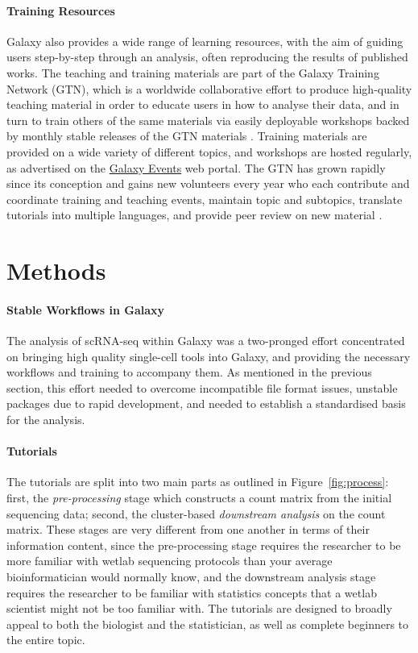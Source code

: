 \documentclass[a4paper,num-refs]{oup-contemporary}
\begin{document}
\paragraph{Training Resources}
Galaxy also provides a wide range of learning resources, with the aim of guiding users step-by-step through an analysis, often reproducing the results of published works. The teaching and training materials are part of the Galaxy Training Network (GTN), which is a worldwide collaborative effort to produce high-quality teaching material in order to educate users in how to analyse their data, and in turn to train others of the same materials via easily deployable workshops backed by monthly stable releases of the GTN materials \citep{gtnreleases}. Training materials are provided on a wide variety of different topics, and workshops are hosted regularly, as advertised on the \href{galaxyproject.org/events/}{Galaxy Events} web portal.
The GTN has grown rapidly since its conception and gains new volunteers every year who each contribute and coordinate training and teaching events, maintain topic and subtopics, translate tutorials into multiple languages, and provide peer review on new material \citep{batut2018cell}.


\section{Methods}

\paragraph{Stable Workflows in Galaxy}
The analysis of scRNA-seq within Galaxy was a two-pronged effort concentrated on bringing high quality single-cell tools into Galaxy, and providing the necessary workflows and training to accompany them. As mentioned in the previous section, this effort needed to overcome incompatible file format issues, unstable packages due to rapid development, and needed to establish a standardised basis for the analysis.

\paragraph{Tutorials}
The tutorials are split into two main parts as outlined in Figure~\ref{fig:process}: first, the \textit{pre-processing} stage which constructs a count matrix from the initial sequencing data; second, the cluster-based \textit{downstream analysis}  on the count matrix. These stages are very different from one another in terms of their information content, since the pre-processing stage requires the researcher to be more familiar with wetlab sequencing protocols than your average bioinformatician would normally know, and the downstream analysis stage requires the researcher to be familiar with statistics concepts that a wetlab scientist might not be too familiar with. The tutorials are designed to broadly appeal to both the biologist and the statistician, as well as complete beginners to the entire topic.
\end{document}
